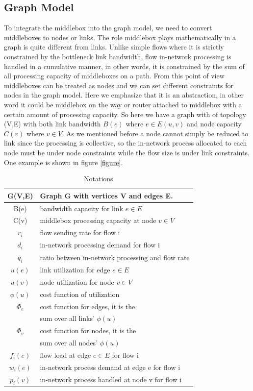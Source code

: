 \documentclass{sig-alternate}
\begin{document}
\subsection{Graph Model}


To integrate the middlebox into the graph model, we need to convert middleboxes to nodes or links. The role middlebox plays mathematically in a graph is quite different from links. Unlike simple flows where it is strictly constrained by the bottleneck link bandwidth, flow in-network processing is handled in a cumulative manner, in other words, it is constrained by the sum of all processing capacity of middleboxes on a path. From this point of view middleboxes can be treated as nodes and we can set different constraints for nodes in the graph model. Here we emphasize that it is an abstraction, in other word  it could be middlebox on the way or router attached to middlebox with a certain amount of processing capacity. So here we have a graph with of topology (V,E) with both link bandwidth $B(e)$ where $e \in E(u,v)$ and node capacity $C(v)$ where $v \in V$. As we mentioned before a node cannot simply be reduced to link since the processing is collective, so the in-network process allocated to each node must be under node constraints while the flow size is under link constraints. One example is shown in figure \ref{figure}.

\begin{table}[h]

\begin{tabular} {|c |l |}
\hline
G(V,E)&Graph G with vertices V and edges E.\\ \hline
B(e)&bandwidth capacity for link $e \in E$\\ \hline
C(v)&middlebox processing capacity at node $v \in V$\\ \hline
$r_i$&flow sending rate for flow i\\ \hline
$d_i$&in-network processing demand for flow i \\ \hline
$q_i$&ratio between in-network processing and flow rate\\ \hline
$u(e) $&link utilization for edge $ e \in E $\\ \hline
$u(v)$&node utilization for node $ v \in V$\\ \hline
$\phi(u)$&cost function of utilization\\ \hline
$\Phi_e$&cost function for edges, it is the\\
&sum over all links' $\phi(u)$\\ \hline
$\Phi_v$&cost function for nodes,  it is the\\
&sum over all nodes' $\phi(u)$\\\Xhline{3\arrayrulewidth}
$ f_i(e)$&flow load at edge $e\in E $ for flow i\\ \hline
$ w_i(e)$&in-network process demand at edge e for flow i\\ \hline
$p_i(v)$&in-network process handled at node v for flow i\\ \hline
\end{tabular}
\caption{Notations}
\end{table}
\end{document}

